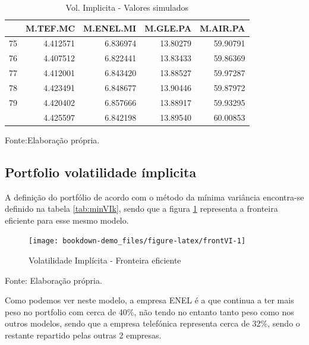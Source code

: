 \documentclass[
  12pt,
  a4paper,
  openany]{book}
\begin{document}
\begin{table}[!h]

\caption{\label{tab:SimVIk}Vol. Implicita - Valores simulados}
\centering
\begin{tabular}[t]{lrrrr}
\toprule
  & M.TEF.MC & M.ENEL.MI & M.GLE.PA & M.AIR.PA\\
\midrule
75 & 4.412571 & 6.836974 & 13.80279 & 59.90791\\
76 & 4.407512 & 6.822441 & 13.83433 & 59.86369\\
77 & 4.412001 & 6.843420 & 13.88527 & 59.97287\\
78 & 4.423491 & 6.848677 & 13.90446 & 59.87972\\
79 & 4.420402 & 6.857666 & 13.88917 & 59.93295\\
\addlinespace
80 & 4.425597 & 6.842198 & 13.89540 & 60.00853\\
\bottomrule
\end{tabular}
\end{table}
\FloatBarrier
\centering

Fonte:Elaboração própria.

\justifying
\bigskip

\hypertarget{portfolio-volatilidade-uxedmplicita}{%
\subsection{Portfolio volatilidade ímplicita}\label{portfolio-volatilidade-uxedmplicita}}

A definição do portfólio de acordo com o método da mínima variância encontra-se definido na tabela \ref{tab:minVIk}, sendo que a figura \ref{fig:frontVI} representa a fronteira eficiente para esse mesmo modelo.

\begin{figure}

{\centering \texttt{[image: bookdown-demo\_files/figure-latex/frontVI-1]} 

}

\caption{Volatilidade Implícita - Fronteira eficiente}\label{fig:frontVI}
\end{figure}
\FloatBarrier
\centering

Fonte: Elaboração própria.

\justifying
\bigskip

Como podemos ver neste modelo, a empresa ENEL é a que continua a ter mais peso no portfolio com cerca de 40\%, não tendo no entanto tanto peso como nos outros modelos, sendo que a empresa telefónica representa cerca de 32\%, sendo o restante repartido pelas outras 2 empresas.
\end{document}
